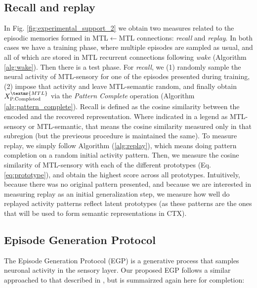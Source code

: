 \documentclass{article}
\begin{document}
\subsection*{Recall and replay}
In Fig. \ref{fig:experimental_support_2} we obtain two measures related to the episodic memories formed in MTL$\leftarrow$MTL connections: \textit{recall} and \textit{replay}. In both cases we have a training phase, where multiple episodes are sampled as usual, and all of which are stored in MTL recurrent connections following \textit{wake} (Algorithm \ref{alg:wake}). Then there is a test phase. For \textit{recall}, we (1) randomly sample the neural activity of MTL-sensory for one of the episodes presented during training, (2) impose that activity and leave MTL-semantic random, and finally obtain $X^\textmr{MTL}_\textrm{P.Completed}$ via the \textit{Pattern Complete} operation (Algorithm \ref{alg:pattern_complete}). Recall is defined as the cosine similarity between the encoded and the recovered representation. Where indicated in a legend as MTL-sensory or MTL-semantic, that means the cosine similarity measured only in that subregion (but the previeous procedure is maintained the same). To measure  replay, we simply follow Algorithm (\ref{alg:replay}), which means doing pattern completion on a random initial activity pattern. Then, we measure the cosine similarity of MTL-sensory with each of the different prototypes (Eq. \eqref{eq:prototype}), and obtain the highest score across all prototypes. Intuitively, because there was no original pattern presented, and because we are interested in measuring replay as an initial generalization step, we measure how well do replayed activity patterns reflect latent prototypes (as these patterns are the ones that will be used to form semantic representations in CTX). 
\subsection*{Episode Generation Protocol}
The Episode Generation Protocol (EGP) is a generative process that samples neuronal activity in the sensory layer. Our proposed EGP follows a similar approached to that described in , but is summairzed again here for completion:
\end{document}
